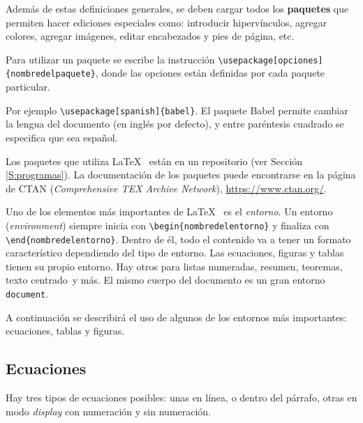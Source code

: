 \documentclass[12pt,letterpaper]{article}
\begin{document}
Además de estas definiciones generales, se deben cargar todos los \textbf{paquetes} que permiten hacer ediciones especiales como: introducir hipervínculos, agregar colores, agregar imágenes, editar encabezados y pies de página, etc. 

Para utilizar un paquete se escribe la instrucción \verb+\usepackage[opciones]{nombredelpaquete}+, donde las opciones están definidas por cada paquete particular. 

Por ejemplo \verb+\usepackage[spanish]{babel}+. El paquete Babel permite cambiar la lengua del documento (en inglés por defecto), y entre paréntesis cuadrado se especifica que sea español.

Los paquetes que utiliza \LaTeX~ están en un repositorio (ver Sección \ref{S:programas}). La documentación de los paquetes puede encontrarse en la página de CTAN (\textit{Comprehensive TEX Archive Network}), \url{https://www.ctan.org/}.

Uno de los elementos más importantes de \LaTeX~ es el \emph{entorno}. Un entorno (\emph{environment}) siempre inicia con \verb+\begin{nombredelentorno}+ y finaliza con \verb+\end{nombredelentorno}+. Dentro de él, todo el contenido va a tener un formato característico dependiendo del tipo de entorno. Las ecuaciones, figuras y tablas tienen su propio entorno. Hay otros para listas numeradas, resumen, teoremas, texto centrado\ y más. El mismo cuerpo del documento es un gran entorno \texttt{document}.

A continuación se describirá el uso de algunos de los entornos más importantes: ecuaciones, tablas y figuras.

\subsection{Ecuaciones}

Hay tres tipos de ecuaciones posibles: unas en línea, o dentro del párrafo, otras en modo \emph{display} con numeración y sin numeración. 
\end{document}
